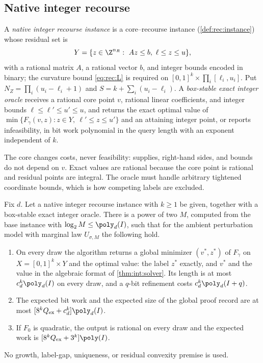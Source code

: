 \subsection{Native integer recourse}\label{sec:int:native}

\begin{definition}\label{def:int:native}
A \emph{native integer recourse instance} is a core--recourse instance
(\cref{def:rec:instance}) whose residual set is
\[
 Y=\{z\in\Z^{n_R}:\ Az\le b,\ \ell\le z\le u\},
\]
with a rational matrix $A$, a rational vector $b$, and integer bounds
encoded in binary; the curvature bound \eqref{eq:rec:L} is required on
$[0,1]^k\times\prod_i[\ell_i,u_i]$. Put $N_Z=\prod_i(u_i-\ell_i+1)$ and
$S=k+\sum_i(u_i-\ell_i)$. A \emph{box-stable exact integer oracle} receives
a rational core point $v$, rational linear coefficients, and integer bounds
$\ell\le\ell'\le u'\le u$, and returns the exact optimal value of
$\min\{F_\gamma(v,z):z\in Y,\ \ell'\le z\le u'\}$ and an attaining integer
point, or reports infeasibility, in bit work polynomial in the query length
with an exponent independent of $k$.
\end{definition}

The core changes costs, never feasibility: supplies, right-hand sides, and
bounds do not depend on $v$. Exact values are rational because the core point
is rational and residual points are integral. The oracle must handle
arbitrary tightened coordinate bounds, which is how competing labels are
excluded.

\begin{theorem}\label{thm:int:native}
Fix $d$. Let a native integer recourse instance with $k\ge1$ be given,
together with a box-stable exact integer oracle. There is a power of two $M$,
computed from the base instance with $\log_2M\le\poly_d(I)$, such that for the
ambient perturbation model with marginal law $U_{\sigma,M}$ the following
hold.
\begin{enumerate}[label=(\roman*)]
\item On every draw the algorithm returns a global minimizer $(v^*,z^*)$ of
$F_\gamma$ on $X=[0,1]^k\times Y$ and the optimal value: the label $z^*$
exactly, and $v^*$ and the value in the algebraic format of
\cref{thm:int:solver}. Its length is at most $c_d^k\poly_d(I)$ on every
draw, and a $q$-bit refinement costs $c_d^k\poly_d(I+q)$.
\item The expected bit work and the expected size of the global proof record
are at most $[8^kQ_{\rm ex}+c_d^k]\poly_d(I)$.
\item If $F_0$ is quadratic, the output is rational on every draw and the
expected work is $[8^kQ_{\rm ex}+3^k]\poly(I)$.
\end{enumerate}
No growth, label-gap, uniqueness, or residual convexity premise is used.
\end{theorem}

